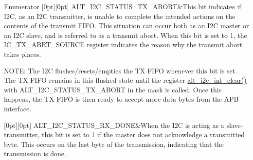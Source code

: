 \begin{DoxyEnumFields}{Enumerator}
[0pt][0pt]{}\mbox{\label{group__ALT__I2C_gga229c6d995595615ca923ecc8b6490603a10730c376d727e9a7d7597bb61c3c296}} 
A\+L\+T\+\_\+\+I2\+C\+\_\+\+S\+T\+A\+T\+U\+S\+\_\+\+T\+X\+\_\+\+A\+B\+O\+RT&This bit indicates if I2C, as an I2C transmitter, is unable to complete the intended actions on the contents of the transmit F\+I\+FO. This situation can occur both as an I2C master or an I2C slave, and is referred to as a \textquotesingle{}transmit abort\textquotesingle{}. When this bit is set to 1, the I\+C\+\_\+\+T\+X\+\_\+\+A\+B\+R\+T\+\_\+\+S\+O\+U\+R\+CE register indicates the reason why the transmit abort takes places.

N\+O\+TE\+: The I2C flushes/resets/empties the TX F\+I\+FO whenever this bit is set. The TX F\+I\+FO remains in this flushed state until the register \mbox{\hyperlink{group__ALT__I2C__INT_gae00500b27051a82ff75905e777f0e1c8}{alt\+\_\+i2c\+\_\+int\+\_\+clear()}} with A\+L\+T\+\_\+\+I2\+C\+\_\+\+S\+T\+A\+T\+U\+S\+\_\+\+T\+X\+\_\+\+A\+B\+O\+RT in the mask is called. Once this happens, the TX F\+I\+FO is then ready to accept more data bytes from the A\+PB interface. \\
\hline

[0pt][0pt]{}\mbox{\label{group__ALT__I2C_gga229c6d995595615ca923ecc8b6490603aa7e8235315c7d8adcceb16b35ef690a4}} 
A\+L\+T\+\_\+\+I2\+C\+\_\+\+S\+T\+A\+T\+U\+S\+\_\+\+R\+X\+\_\+\+D\+O\+NE&When the I2C is acting as a slave-\/transmitter, this bit is set to 1 if the master does not acknowledge a transmitted byte. This occurs on the last byte of the transmission, indicating that the transmission is done. \\
\hline


\end{DoxyEnumFields}
